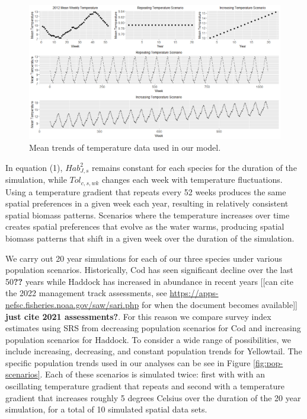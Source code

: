 \documentclass[
  12pt,
]{article}
\begin{document}
\begin{figure}

{\centering \includegraphics[width=0.95\linewidth]{Images/TempScenarios} 

}

\caption{Mean trends of temperature data used in our model.}\label{fig:temp-scenarios}
\end{figure}

In equation (1), \(Hab^2_{J,s}\) remains constant for each species for the duration of the simulation, while \(Tol_{c,s,wk}\) changes each week with temperature fluctuations. Using a temperature gradient that repeats every 52 weeks produces the same spatial preferences in a given week each year, resulting in relatively consistent spatial biomass patterns. Scenarios where the temperature increases over time creates spatial preferences that evolve as the water warms, producing spatial biomass patterns that shift in a given week over the duration of the simulation.

We carry out 20 year simulations for each of our three species under various population scenarios. Historically, Cod has seen significant decline over the last 50\textbf{??} years while Haddock has increased in abundance in recent years {[}{[}can cite the 2022 management track assessments, see \url{https://apps-nefsc.fisheries.noaa.gov/saw/sari.php} for when the document becomes available{]}{]} \textbf{just cite 2021 assessments?}. For this reason we compare survey index estimates using SRS from decreasing population scenarios for Cod and increasing population scenarios for Haddock. To consider a wide range of possibilities, we include increasing, decreasing, and constant population trends for Yellowtail. The specific population trends used in our analyses can be see in Figure \ref{fig:pop-scenarios}. Each of these scenarios is simulated twice: first with with an oscillating temperature gradient that repeats and second with a temperature gradient that increases roughly 5 degrees Celsius over the duration of the 20 year simulation, for a total of 10 simulated spatial data sets.
\end{document}
